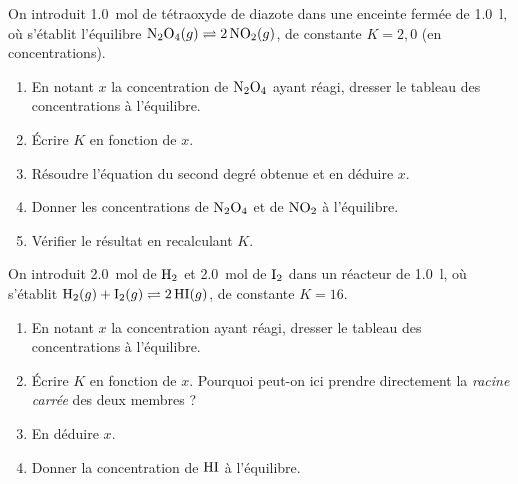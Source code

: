 \documentclass[11pt,a4paper]{article}
\begin{document}
\begin{center}
\end{center}

\begin{exercice}
On introduit \SI{1.0}{\mol} de tétraoxyde de diazote dans une enceinte fermée de \SI{1.0}{\litre}, où
s'établit l'équilibre \;$\ce{N2O4}(g) \rightleftharpoons 2\,\ce{NO2}(g)$,\; de constante $K = 2{,}0$ (en
concentrations).
\begin{enumerate}[label=\alph*),leftmargin=2em,topsep=2pt,itemsep=2pt]
  \item En notant $x$ la concentration de $\ce{N2O4}$ ayant réagi, dresser le tableau des concentrations
        à l'équilibre.
  \item Écrire $K$ en fonction de $x$.
  \item Résoudre l'équation du second degré obtenue et en déduire $x$.
  \item Donner les concentrations de $\ce{N2O4}$ et de $\ce{NO2}$ à l'équilibre.
  \item Vérifier le résultat en recalculant $K$.
\end{enumerate}
\end{exercice}

\begin{exercice}
On introduit \SI{2.0}{\mol} de $\ce{H2}$ et \SI{2.0}{\mol} de $\ce{I2}$ dans un réacteur de \SI{1.0}{\litre},
où s'établit \;$\ce{H2}(g) + \ce{I2}(g) \rightleftharpoons 2\,\ce{HI}(g)$,\; de constante $K = 16$.
\begin{enumerate}[label=\alph*),leftmargin=2em,topsep=2pt,itemsep=2pt]
  \item En notant $x$ la concentration ayant réagi, dresser le tableau des concentrations à l'équilibre.
  \item Écrire $K$ en fonction de $x$. Pourquoi peut-on ici prendre directement la \emph{racine carrée}
        des deux membres ?
  \item En déduire $x$.
  \item Donner la concentration de $\ce{HI}$ à l'équilibre.
\end{enumerate}
\end{exercice}
\end{document}
